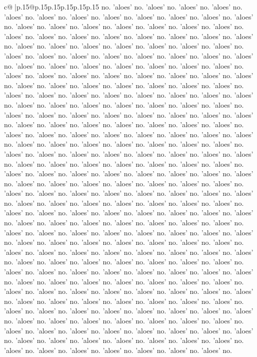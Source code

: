 \documentclass{article}
\begin{document}
{\begin{supertabular}{c@{$\;$}|p{.15\linewidth}@{}p{.15\linewidth}p{.15\linewidth}p{.15\linewidth}p{.15\linewidth}p{.15\linewidth}}
{{{no. 'aloes' no. 'aloes' no. 'aloes' no. 'aloes' no. 'aloes' no. 'aloes' no. 'aloes' no. 'aloes' no. 'aloes' no. 'aloes' no. 'aloes' no. 'aloes' no. 'aloes' no. 'aloes' no. 'aloes' no. 'aloes' no. 'aloes' no. 'aloes' no. 'aloes' no. 'aloes' no. 'aloes' no. 'aloes' no. 'aloes' no. 'aloes' no. 'aloes' no. 'aloes' no. 'aloes' no. 'aloes' no. 'aloes' no. 'aloes' no. 'aloes' no. 'aloes' no. 'aloes' no. 'aloes' no. 'aloes' no. 'aloes' no. 'aloes' no. 'aloes' no. 'aloes' no. 'aloes' no. 'aloes' no. 'aloes' no. 'aloes' no. 'aloes' no. 'aloes' no. 'aloes' no. 'aloes' no. 'aloes' no. 'aloes' no. 'aloes' no. 'aloes' no. 'aloes' no. 'aloes' no. 'aloes' no. 'aloes' no. 'aloes' no. 'aloes' no. 'aloes' no. 'aloes' no. 'aloes' no. 'aloes' no. 'aloes' no. 'aloes' no. 'aloes' no. 'aloes' no. 'aloes' no. 'aloes' no. 'aloes' no. 'aloes' no. 'aloes' no. 'aloes' no. 'aloes' no. 'aloes' no. 'aloes' no. 'aloes' no. 'aloes' no. 'aloes' no. 'aloes' no. 'aloes' no. 'aloes' no. 'aloes' no. 'aloes' no. 'aloes' no. 'aloes' no. 'aloes' no. 'aloes' no. 'aloes' no. 'aloes' no. 'aloes' no. 'aloes' no. 'aloes' no. 'aloes' no. 'aloes' no. 'aloes' no. 'aloes' no. 'aloes' no. 'aloes' no. 'aloes' no. 'aloes' no. 'aloes' no. 'aloes' no. 'aloes' no. 'aloes' no. 'aloes' no. 'aloes' no. 'aloes' no. 'aloes' no. 'aloes' no. 'aloes' no. 'aloes' no. 'aloes' no. 'aloes' no. 'aloes' no. 'aloes' no. 'aloes' no. 'aloes' no. 'aloes' no. 'aloes' no. 'aloes' no. 'aloes' no. 'aloes' no. 'aloes' no. 'aloes' no. 'aloes' no. 'aloes' no. 'aloes' no. 'aloes' no. 'aloes' no. 'aloes' no. 'aloes' no. 'aloes' no. 'aloes' no. 'aloes' no. 'aloes' no. 'aloes' no. 'aloes' no. 'aloes' no. 'aloes' no. 'aloes' no. 'aloes' no. 'aloes' no. 'aloes' no. 'aloes' no. 'aloes' no. 'aloes' no. 'aloes' no. 'aloes' no. 'aloes' no. 'aloes' no. 'aloes' no. 'aloes' no. 'aloes' no. 'aloes' no. 'aloes' no. 'aloes' no. 'aloes' no. 'aloes' no. 'aloes' no. 'aloes' no. 'aloes' no. 'aloes' no. 'aloes' no. 'aloes' no. 'aloes' no. 'aloes' no. 'aloes' no. 'aloes' no. 'aloes' no. 'aloes' no. 'aloes' no. 'aloes' no. 'aloes' no. 'aloes' no. 'aloes' no. 'aloes' no. 'aloes' no. 'aloes' no. 'aloes' no. 'aloes' no. 'aloes' no. 'aloes' no. 'aloes' no. 'aloes' no. 'aloes' no. 'aloes' no. 'aloes' no. 'aloes' no. 'aloes' no. 'aloes' no. 'aloes' no. 'aloes' no. 'aloes' no. 'aloes' no. 'aloes' no. 'aloes' no. 'aloes' no. 'aloes' no. 'aloes' no. 'aloes' no. 'aloes' no. 'aloes' no. 'aloes' no. 'aloes' no. 'aloes' no. 'aloes' no. 'aloes' no. 'aloes' no. 'aloes' no. 'aloes' no. 'aloes' no. 'aloes' no. 'aloes' no. 'aloes' no. 'aloes' no. 'aloes' no. 'aloes' no. 'aloes' no. 'aloes' no. 'aloes' no. 'aloes' no. 'aloes' no. 'aloes' no. 'aloes' no. 'aloes' no. 'aloes' no. 'aloes' no. 'aloes' no. 'aloes' no. 'aloes' no. 'aloes' no. 'aloes' no. 'aloes' no. 'aloes' no. 'aloes' no. 'aloes' no. 'aloes' no. 'aloes' no. 'aloes' no. 'aloes' no. 'aloes' no. 'aloes' no. 'aloes' no. 'aloes' no. 'aloes' no. 'aloes' no. 'aloes' no. 'aloes' no. 'aloes' no. 'aloes' no. 'aloes' no. 'aloes' no. 'aloes' no. 'aloes' no. 'aloes' no. 'aloes' no. 'aloes' no. 'aloes' no. 'aloes' no. 'aloes' no. 'aloes' no. 'aloes' no. 'aloes' no. 'aloes' no. 'aloes' no. 'aloes' no. 'aloes' no. }}}
\end{supertabular}}
\end{document}
